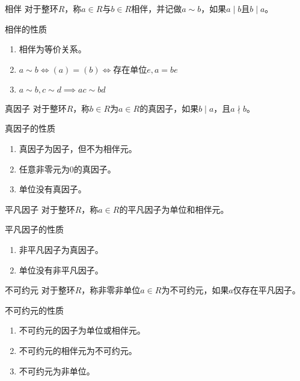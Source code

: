 \documentclass[lang = cn, scheme = chinese, thmcnt = section]{elegantbook}
\begin{document}
\begin{definition}{相伴}
	对于整环$R$，称$a\in R$与$b\in R$相伴，并记做$a\sim b$，如果$a\mid b$且$b\mid a$。
\end{definition}

\begin{proposition}{相伴的性质}
	\begin{enumerate}
		\item 相伴为等价关系。
		\item $a\sim b\iff (a)=(b)\iff\text{存在单位}e,a=be$
		\item $a\sim b,c\sim d\implies ac\sim bd$
	\end{enumerate}
\end{proposition}

\begin{definition}{真因子}
	对于整环$R$，称$b\in R$为$a\in R$的真因子，如果$b\mid a$，且$a\nmid b$。
\end{definition}

\begin{proposition}{真因子的性质}
	\begin{enumerate}
		\item 真因子为因子，但不为相伴元。
		\item 任意非零元为$0$的真因子。
		\item 单位没有真因子。
	\end{enumerate}
\end{proposition}

\begin{definition}{平凡因子}
	对于整环$R$，称$a\in R$的平凡因子为单位和相伴元。
\end{definition}

\begin{proposition}{平凡因子的性质}
	\begin{enumerate}
		\item 非平凡因子为真因子。
		\item 单位没有非平凡因子。
	\end{enumerate}
\end{proposition}

\begin{definition}{不可约元}
	对于整环$R$，称非零非单位$a\in R$为不可约元，如果$a$仅存在平凡因子。
\end{definition}

\begin{proposition}{不可约元的性质}
	\begin{enumerate}
		\item 不可约元的因子为单位或相伴元。
		\item 不可约元的相伴元为不可约元。
		\item 不可约元为非单位。
	\end{enumerate}
\end{proposition}
\end{document}

